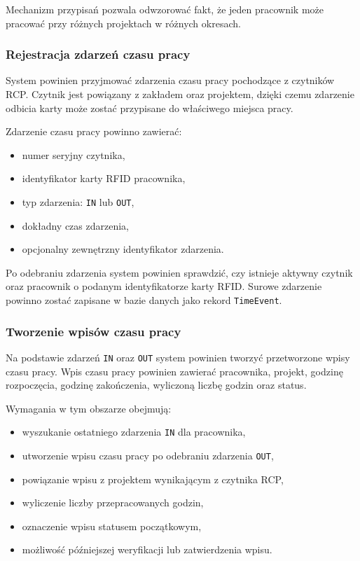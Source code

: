 Mechanizm przypisań pozwala odwzorować fakt, że jeden pracownik może pracować przy różnych projektach w różnych okresach.

\subsubsection{Rejestracja zdarzeń czasu pracy}

System powinien przyjmować zdarzenia czasu pracy pochodzące z czytników RCP. Czytnik jest powiązany z zakładem oraz projektem, dzięki czemu zdarzenie odbicia karty może zostać przypisane do właściwego miejsca pracy.

Zdarzenie czasu pracy powinno zawierać:
\begin{itemize}
    \item numer seryjny czytnika,
    \item identyfikator karty RFID pracownika,
    \item typ zdarzenia: \texttt{IN} lub \texttt{OUT},
    \item dokładny czas zdarzenia,
    \item opcjonalny zewnętrzny identyfikator zdarzenia.
\end{itemize}

Po odebraniu zdarzenia system powinien sprawdzić, czy istnieje aktywny czytnik oraz pracownik o podanym identyfikatorze karty RFID. Surowe zdarzenie powinno zostać zapisane w bazie danych jako rekord \texttt{TimeEvent}.

\subsubsection{Tworzenie wpisów czasu pracy}

Na podstawie zdarzeń \texttt{IN} oraz \texttt{OUT} system powinien tworzyć przetworzone wpisy czasu pracy. Wpis czasu pracy powinien zawierać pracownika, projekt, godzinę rozpoczęcia, godzinę zakończenia, wyliczoną liczbę godzin oraz status.

Wymagania w tym obszarze obejmują:
\begin{itemize}
    \item wyszukanie ostatniego zdarzenia \texttt{IN} dla pracownika,
    \item utworzenie wpisu czasu pracy po odebraniu zdarzenia \texttt{OUT},
    \item powiązanie wpisu z projektem wynikającym z czytnika RCP,
    \item wyliczenie liczby przepracowanych godzin,
    \item oznaczenie wpisu statusem początkowym,
    \item możliwość późniejszej weryfikacji lub zatwierdzenia wpisu.
\end{itemize}

